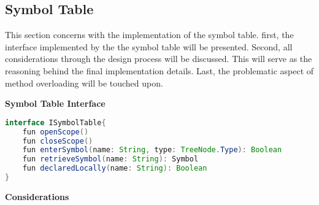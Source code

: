 \subsection{Symbol Table}
This section concerns with the implementation of the symbol table. 
first, the interface implemented by the the symbol table will be presented.
Second, all considerations through the design process will be discussed.
This will serve as the reasoning behind the final implementation details.
Last, the problematic aspect of method overloading will be touched upon.

\textbf{Symbol Table Interface}\\
\begin{lstlisting}[language=java,label=lis:STInterface,caption=The interface which all symbol table implementations must implement.]
interface ISymbolTable{
	fun openScope()
	fun closeScope()
	fun enterSymbol(name: String, type: TreeNode.Type): Boolean
	fun retrieveSymbol(name: String): Symbol
	fun declaredLocally(name: String): Boolean
}
\end{lstlisting}

\textbf{Considerations}\\
